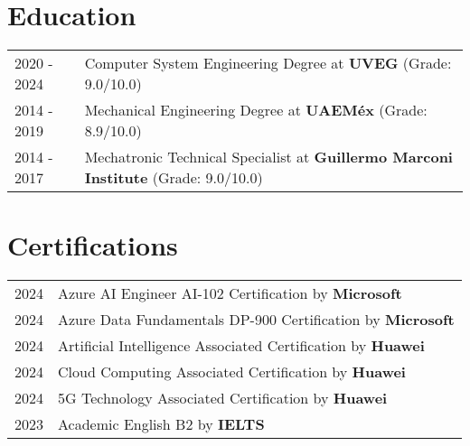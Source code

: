 \documentclass[a4paper,12pt]{article}
\begin{document}
\section{Education}
\begin{tabularx}{\linewidth}{@{}l X@{}}	
2020 - 2024 & Computer System Engineering Degree at \textbf{UVEG} \hfill \normalsize (Grade: 9.0/10.0) \\

2014 - 2019 & Mechanical Engineering Degree at \textbf{UAEMéx} \hfill (Grade: 8.9/10.0) \\ 

2014 - 2017 & Mechatronic Technical Specialist at \textbf{Guillermo Marconi Institute} \hfill  (Grade: 9.0/10.0) \\
\end{tabularx}

\section{Certifications}
\begin{tabularx}{\linewidth}{@{}l X@{}}	
2024 & Azure AI Engineer AI-102 Certification by \textbf{Microsoft} \hfill  \\

2024 & Azure Data Fundamentals DP-900 Certification by \textbf{Microsoft} \hfill \normalsize \\

2024 & Artificial Intelligence Associated Certification by \textbf{Huawei} \hfill \\ 

2024 & Cloud Computing Associated Certification by \textbf{Huawei} \hfill \\

2024 & 5G Technology Associated Certification by \textbf{Huawei} \hfill \\

2023 & Academic English B2 by \textbf{IELTS} \hfill \\
\end{tabularx}

\end{document}
